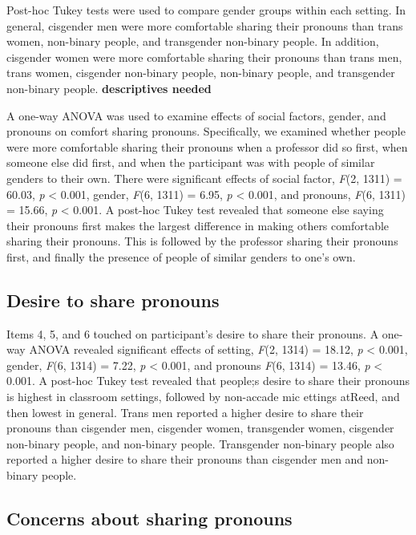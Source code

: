 \documentclass[12pt,twoside]{reedthesis}
\begin{document}
Post-hoc Tukey tests were used to compare gender groups within each setting. In general, cisgender men were more comfortable sharing their pronouns than trans women, non-binary people, and transgender non-binary people. In addition, cisgender women were more comfortable sharing their pronouns than trans men, trans women, cisgender non-binary people, non-binary people, and transgender non-binary people. \textbf{descriptives needed}

A one-way ANOVA was used to examine effects of social factors, gender, and pronouns on comfort sharing pronouns. Specifically, we examined whether people were more comfortable sharing their pronouns when a professor did so first, when someone else did first, and when the participant was with people of similar genders to their own. There were significant effects of social factor, \emph{F}(2, 1311) = 60.03, \emph{p} \textless{} 0.001, gender, \emph{F}(6, 1311) = 6.95, \emph{p} \textless{} 0.001, and pronouns, \emph{F}(6, 1311) = 15.66, \emph{p} \textless{} 0.001. A post-hoc Tukey test revealed that someone else saying their pronouns first makes the largest difference in making others comfortable sharing their pronouns. This is followed by the professor sharing their pronouns first, and finally the presence of people of similar genders to one's own.

\hypertarget{desire-to-share-pronouns}{%
\subsection{Desire to share pronouns}\label{desire-to-share-pronouns}}

Items 4, 5, and 6 touched on participant's desire to share their pronouns. A one-way ANOVA revealed significant effects of setting, \emph{F}(2, 1314) = 18.12, \emph{p} \textless{} 0.001, gender, \emph{F}(6, 1314) = 7.22, \emph{p} \textless{} 0.001, and pronouns \emph{F}(6, 1314) = 13.46, \emph{p} \textless{} 0.001. A post-hoc Tukey test revealed that people;s desire to share their pronouns is highest in classroom settings, followed by non-accade mic ettings atReed, and then lowest in general. Trans men reported a higher desire to share their pronouns than cisgender men, cisgender women, transgender women, cisgender non-binary people, and non-binary people. Transgender non-binary people also reported a higher desire to share their pronouns than cisgender men and non-binary people.

\hypertarget{concerns-about-sharing-pronouns}{%
\subsection{Concerns about sharing pronouns}\label{concerns-about-sharing-pronouns}}
\end{document}
